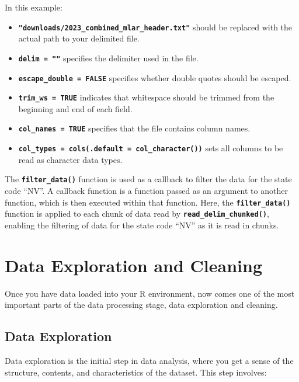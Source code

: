 \documentclass[
]{book}
\providecommand{\tightlist}{%
  \setlength{\itemsep}{0pt}\setlength{\parskip}{0pt}}
\begin{document}
In this example:

\begin{itemize}
\tightlist
\item
  \textbf{\texttt{"downloads/2023\_combined\_mlar\_header.txt"}} should be replaced with the actual path to your delimited file.
\item
  \textbf{\texttt{delim\ =\ "\textbar{}"}} specifies the delimiter used in the file.
\item
  \textbf{\texttt{escape\_double\ =\ FALSE}} specifies whether double quotes should be escaped.
\item
  \textbf{\texttt{trim\_ws\ =\ TRUE}} indicates that whitespace should be trimmed from the beginning and end of each field.
\item
  \textbf{\texttt{col\_names\ =\ TRUE}} specifies that the file contains column names.
\item
  \textbf{\texttt{col\_types\ =\ cols(.default\ =\ col\_character())}} sets all columns to be read as character data types.
\end{itemize}

The \textbf{\texttt{filter\_data()}} function is used as a callback to filter the data for the state code ``NV''. A callback function is a function passed as an argument to another function, which is then executed within that function. Here, the \textbf{\texttt{filter\_data()}} function is applied to each chunk of data read by \textbf{\texttt{read\_delim\_chunked()}}, enabling the filtering of data for the state code ``NV'' as it is read in chunks.

\hypertarget{data-exploration-and-cleaning}{%
\chapter{Data Exploration and Cleaning}\label{data-exploration-and-cleaning}}

Once you have data loaded into your R environment, now comes one of the most important parts of the data processing stage, data exploration and cleaning.

\hypertarget{data-exploration}{%
\section*{Data Exploration}\label{data-exploration}}

Data exploration is the initial step in data analysis, where you get a sense of the structure, contents, and characteristics of the dataset. This step involves:
\end{document}
